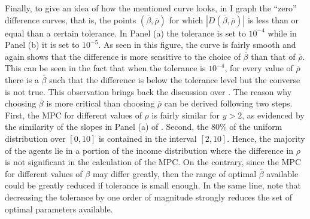 \documentclass[english, a4paper, 12pt]{article}
\begin{document}
%
	
Finally, to give an idea of how the mentioned curve looks, in  I graph the ``zero'' difference curves, that is, the points $(\overline{\beta}, \overline{\rho})$ for which $|D(\overline{\beta}, \overline{\rho})|$ is less than or equal than a certain tolerance. In Panel (a) the tolerance is set to $10^{-4}$ while in Panel (b) it is set to $10^{-5}$. As seen in this figure, the curve is fairly smooth and again shows that the difference is more sensitive to the choice of $\overline{\beta}$ than that of $\overline{\rho}$. This can be seen in the fact that when the tolerance is $10^{-4}$, for every value of $\overline{\rho}$ there is a $\overline{\beta}$ such that the difference is below the tolerance level but the converse is not true. This observation brings back the discussion over . The reason why choosing $\overline{\beta}$ is more critical than choosing $\overline{\rho}$ can be derived following two steps. First, the MPC for different values of $\rho$ is fairly similar for $y > 2$, as evidenced by the similarity of the slopes in Panel (a) of . Second, the 80\% of the uniform distribution over $[0,10]$ is contained in the interval $[2,10]$. Hence, the majority of the agents lie in a portion of the income distribution where the difference in $\rho$ is not significant in the calculation of the MPC. On the contrary, since the MPC for different values of $\beta$ may differ greatly, then the range of optimal $\overline{\beta}$ available could be greatly reduced if tolerance is small enough. In the same line, note that decreasing the tolerance by one order of magnitude strongly reduces the set of optimal parameters available.
\end{document}
